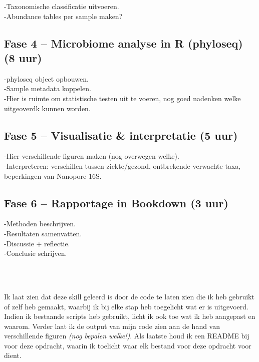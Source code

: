 \documentclass[
]{book}
\begin{document}
-Taxonomische classificatie uitvoeren.\\
-Abundance tables per sample maken?\\

\subsection{Fase 4 -- Microbiome analyse in R (phyloseq) (8 uur)}\label{fase-4-microbiome-analyse-in-r-phyloseq-8-uur}

-phyloseq object opbouwen.\\
-Sample metadata koppelen.\\
-Hier is ruimte om statistische testen uit te voeren, nog goed nadenken welke uitgeoverdk kunnen worden.\\

\subsection{Fase 5 -- Visualisatie \& interpretatie (5 uur)}\label{fase-5-visualisatie-interpretatie-5-uur}

-Hier verschillende figuren maken (nog overwegen welke).\\
-Interpreteren: verschillen tussen ziekte/gezond, ontbrekende verwachte taxa, beperkingen van Nanopore 16S.\\

\subsection{Fase 6 -- Rapportage in Bookdown (3 uur)}\label{fase-6-rapportage-in-bookdown-3-uur}

-Methoden beschrijven.\\
-Resultaten samenvatten.\\
-Discussie + reflectie.\\
-Conclusie schrijven.\\
\strut \\
\strut \\
Ik laat zien dat deze skill geleerd is door de code te laten zien die ik heb gebruikt of zelf heb gemaakt, waarbij ik bij elke stap heb toegelicht wat er is uitgevoerd. Indien ik bestaande scripts heb gebruikt, licht ik ook toe wat ik heb aangepast en waarom. Verder laat ik de output van mijn code zien aan de hand van verschillende figuren \emph{(nog bepalen welke!)}. Als laatste houd ik een README bij voor deze opdracht, waarin ik toelicht waar elk bestand voor deze opdracht voor dient.
\end{document}
